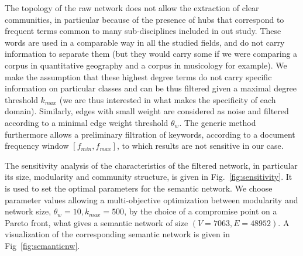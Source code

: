 \documentclass[10pt]{article}
\begin{document}
The topology of the raw network does not allow the extraction of clear communities, in particular because of the presence of hubs that correspond to frequent terms common to many sub-disciplines included in out study. These words are used in a comparable way in all the studied fields, and do not carry information to separate them (but they would carry some if we were comparing a corpus in quantitative geography and a corpus in musicology for example). We make the assumption that these highest degree terms do not carry specific information on particular classes and can be thus filtered given a maximal degree threshold $k_{max}$ (we are thus interested in what makes the specificity of each domain). Similarly, edges with small weight are considered as noise and filtered according to a minimal edge weight threshold $\theta_w$. The generic method furthermore allows a preliminary filtration of keywords, according to a document frequency window $\left[ f_{min},f_{max} \right]$, to which results are not sensitive in our case.

The sensitivity analysis of the characteristics of the filtered network, in particular its size, modularity and community structure, is given in Fig.~\ref{fig:sensitivity}. It is used to set the optimal parameters for the semantic network. We choose parameter values allowing a multi-objective optimization between modularity and network size, $\theta_w = 10,k_{max} = 500$, by the choice of a compromise point on a Pareto front, what gives a semantic network of size $(V=7063,E=48952)$. A visualization of the corresponding semantic network is given in Fig~\ref{fig:semanticnw}.
\end{document}
